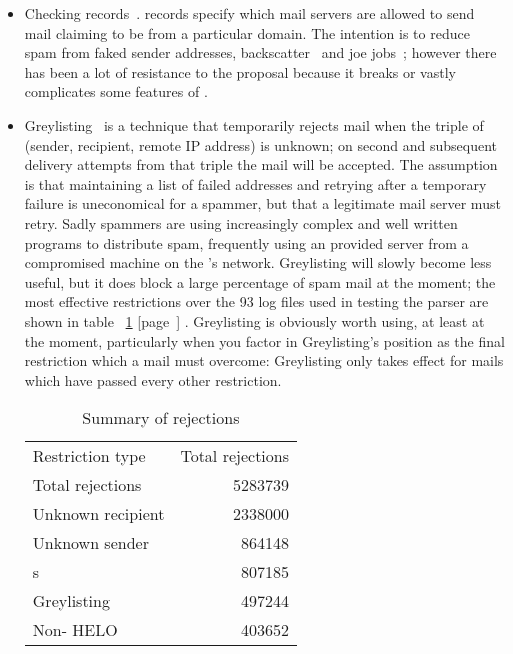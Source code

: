 \documentclass[a4paper,12pt,draft]{article}
\newcommand{\refwithpage}[1]{%
    \empty{}\ref{#1} [page~\pageref{#1}]%
}
\begin{document}
\begin{itemize}

    \item Checking \SPF{} records~\cite{openspf, wikipedia-spf}.  \SPF{}
        records specify which mail servers are allowed to send mail
        claiming to be from a particular domain.  The intention is to
        reduce spam from faked sender addresses,
        backscatter~\cite{postfix-backscatter} and joe
        jobs~\cite{wikipedia-joe-job}; however there has been a lot of
        resistance to the proposal because it breaks or vastly complicates
        some features of \SMTP{}\@.

    \item Greylisting~\cite{greylisting} is a technique that temporarily
        rejects mail when the triple of (sender, recipient, remote IP
        address) is unknown; on second and subsequent delivery attempts
        from that triple the mail will be accepted.  The assumption is that
        maintaining a list of failed addresses and retrying after a
        temporary failure is uneconomical for a spammer, but that a
        legitimate mail server must retry.  Sadly spammers are using
        increasingly complex and well written programs to distribute spam,
        frequently using an \ISP{} provided \SMTP{} server from a
        compromised machine on the \ISP{}'s network.  Greylisting will
        slowly become less useful, but it does block a large percentage of
        spam mail at the moment; the most effective restrictions over the
        93 log files used in testing the parser are shown in
        table~\refwithpage{Summary of rejections}.  Greylisting is
        obviously worth using, at least at the moment, particularly when
        you factor in Greylisting's position as the final restriction which
        a mail must overcome: Greylisting only takes effect for mails which
        have passed every other restriction.

        \begin{table}[ht]
            \caption{Summary of rejections}\label{Summary of rejections}
            \begin{tabular}[]{lr}
                Restriction type    & Total rejections  \\
                Total rejections    & 5283739           \\
                Unknown recipient   & 2338000           \\
                Unknown sender      & 864148            \\
                \RBL{}s             & 807185            \\
                Greylisting         & 497244            \\
                Non-\FQDN{} HELO    & 403652            \\
            \end{tabular}
        \end{table}


\end{itemize}
\end{document}
